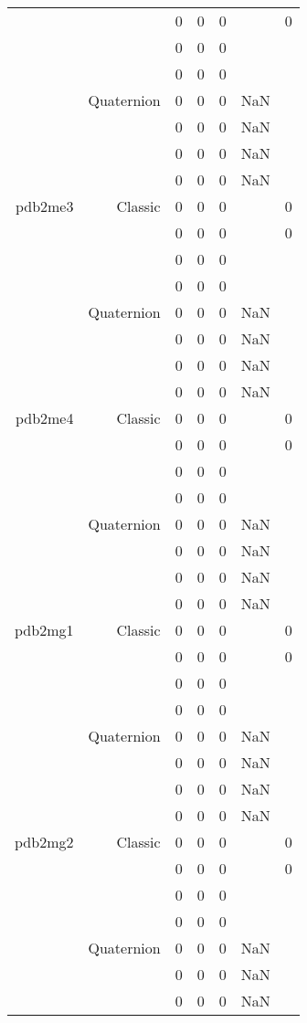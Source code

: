 \begin{xltabular}{\textwidth}{r|rcccSc}
& & 0 & 0 & 0 & & 0 \\
& & 0 & 0 & 0 & & \\
& & 0 & 0 & 0 & & \\
& Quaternion & 0 & 0 & 0 & NaN & \\
& & 0 & 0 & 0 & NaN & \\
& & 0 & 0 & 0 & NaN & \\
& & 0 & 0 & 0 & NaN & \\ \addlinespace
pdb2me3 & Classic & 0 & 0 & 0 & & 0 \\
& & 0 & 0 & 0 & & 0 \\
& & 0 & 0 & 0 & & \\
& & 0 & 0 & 0 & & \\
& Quaternion & 0 & 0 & 0 & NaN & \\
& & 0 & 0 & 0 & NaN & \\
& & 0 & 0 & 0 & NaN & \\
& & 0 & 0 & 0 & NaN & \\ \addlinespace
pdb2me4 & Classic & 0 & 0 & 0 & & 0 \\
& & 0 & 0 & 0 & & 0 \\
& & 0 & 0 & 0 & & \\
& & 0 & 0 & 0 & & \\
& Quaternion & 0 & 0 & 0 & NaN & \\
& & 0 & 0 & 0 & NaN & \\
& & 0 & 0 & 0 & NaN & \\
& & 0 & 0 & 0 & NaN & \\ \addlinespace
pdb2mg1 & Classic & 0 & 0 & 0 & & 0 \\
& & 0 & 0 & 0 & & 0 \\
& & 0 & 0 & 0 & & \\
& & 0 & 0 & 0 & & \\
& Quaternion & 0 & 0 & 0 & NaN & \\
& & 0 & 0 & 0 & NaN & \\
& & 0 & 0 & 0 & NaN & \\
& & 0 & 0 & 0 & NaN & \\ \addlinespace
pdb2mg2 & Classic & 0 & 0 & 0 & & 0 \\
& & 0 & 0 & 0 & & 0 \\
& & 0 & 0 & 0 & & \\
& & 0 & 0 & 0 & & \\
& Quaternion & 0 & 0 & 0 & NaN & \\
& & 0 & 0 & 0 & NaN & \\
& & 0 & 0 & 0 & NaN & \\

\end{xltabular}
